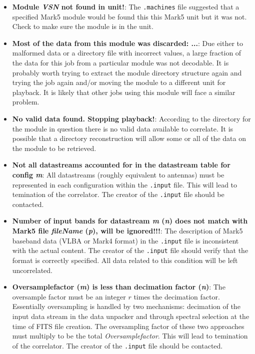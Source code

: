 \begin{itemize}
\item {\bf Module {\it VSN} not found in unit!}:
The {\tt .machines} file suggested that a specified Mark5 module would be found this this Mark5 unit but it was not.
Check to make sure the module is in the unit.

\item {\bf Most of the data from this module was discarded: ...}:
Due either to malformed data or a directory file with incorrect values, a large fraction of the data for this job from a particular module was not decodable.
It is probably worth trying to extract the module directory structure again and trying the job again and/or moving the module to a different unit for playback.
It is likely that other jobs using this module will face a similar problem.

\item {\bf No valid data found.  Stopping playback!}:
According to the directory for the module in question there is no valid data available to correlate.
It is possible that a directory reconstruction will allow some or all of the data on the module to be retrieved.

\item {\bf Not all datastreams accounted for in the datastream table for config {\it m}}:
All datastreams (roughly equivalent to antennas) must be represented in each configuration within the {\tt .input} file.
This will lead to temination of the correlator.
The creator of the {\tt .input} file should be contacted.

\item {\bf Number of input bands for datastream {\it m} ({\it n}) does not match with Mark5 file {\it fileName} ({\it p}), will be ignored!!!}:
The description of Mark5 baseband data (VLBA or Mark4 format) in the {\tt .input} file is inconsistent with the actual content.
The creator of the {\tt .input} file should verify that the format is correctly specified.
All data related to this condition will be left uncorrelated.

\item {\bf Oversamplefactor ({\it m}) is less than decimation factor ({\it n})}:
The oversample factor must be an integer $r$ times the decimation factor.
Essentially oversampling is handled by two mechanisms: decimation of the input data stream in the data unpacker and through spectral selection at the time of FITS file creation.  The oversampling factor of these two approaches must multiply to be the total {\it Oversamplefactor}.
This will lead to temination of the correlator.
The creator of the {\tt .input} file should be contacted.


\end{itemize}
